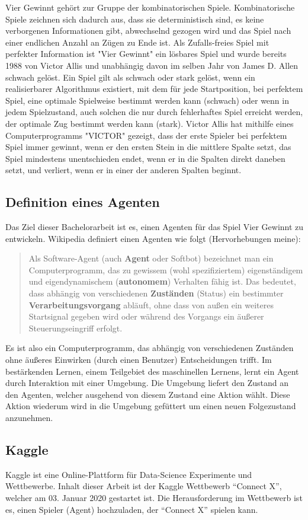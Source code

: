 Vier Gewinnt gehört zur Gruppe der kombinatorischen Spiele. Kombinatorische Spiele zeichnen sich dadurch aus, dass sie deterministisch sind, es keine verborgenen Informationen gibt, abwechselnd gezogen wird und das Spiel nach einer endlichen Anzahl an Zügen zu Ende ist\autocite{KombinatorischeSpieltheorie2019}. Als Zufalls-freies Spiel mit perfekter Information ist "Vier Gewinnt" ein lösbares Spiel und wurde bereits 1988 von Victor Allis\autocite{allisKnowledgeBasedApproachConnectFour1988} und unabhängig davon im selben Jahr von James D. Allen schwach gelöst\autocite{allenExpertPlayConnectFour}. Ein Spiel gilt als schwach oder stark gelöst, wenn ein realisierbarer Algorithmus existiert, mit dem für jede Startposition, bei perfektem Spiel, eine optimale Spielweise bestimmt werden kann (schwach) oder wenn in jedem Spielzustand, auch solchen die nur durch fehlerhaftes Spiel erreicht werden, der optimale Zug bestimmt werden kann (stark)\autocite{GeloesteSpiele2019}. Victor Allis hat mithilfe eines Computerprogramms "VICTOR" gezeigt, dass der erste Spieler bei perfektem Spiel immer gewinnt, wenn er den ersten Stein in die mittlere Spalte setzt, das Spiel mindestens unentschieden endet, wenn er in die Spalten direkt daneben setzt, und verliert, wenn er in einer der anderen Spalten beginnt.

\subsection{Definition eines Agenten}

Das Ziel dieser Bachelorarbeit ist es, einen Agenten für das Spiel Vier Gewinnt zu entwickeln. Wikipedia definiert einen Agenten wie folgt (Hervorhebungen meine):

\begin{quote}
	Als Software-Agent (auch \textbf{Agent} oder Softbot) bezeichnet man ein Computerprogramm, das zu gewissem (wohl spezifiziertem) eigenständigem und eigendynamischem (\textbf{autonomem}) Verhalten fähig ist. Das bedeutet, dass abhängig von verschiedenen \textbf{Zuständen} (Status) ein bestimmter \textbf{Verarbeitungsvorgang} abläuft, ohne dass von außen ein weiteres Startsignal gegeben wird oder während des Vorgangs ein äußerer Steuerungseingriff erfolgt.
	\autocite{SoftwareAgent2019}
\end{quote}

Es ist also ein Computerprogramm, das abhängig von verschiedenen Zuständen ohne äußeres Einwirken (durch einen Benutzer) Entscheidungen trifft. Im bestärkenden Lernen, einem Teilgebiet des maschinellen Lernens, lernt ein Agent durch Interaktion mit einer Umgebung. Die Umgebung liefert den Zustand an den Agenten, welcher ausgehend von diesem Zustand eine Aktion wählt. Diese Aktion wiederum wird in die Umgebung gefüttert um einen neuen Folgezustand anzunehmen.


\subsection{Kaggle}
Kaggle ist eine Online-Plattform für Data-Science Experimente und Wettbewerbe. 
Inhalt dieser Arbeit ist der Kaggle Wettbewerb “Connect X”, welcher am 03. Januar 2020 gestartet ist. Die Herausforderung im Wettbewerb ist es, einen Spieler (Agent) hochzuladen, der “Connect X” spielen kann.
